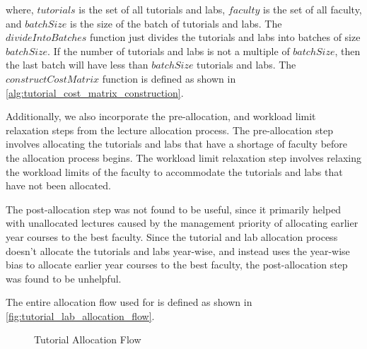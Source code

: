 where, $tutorials$ is the set of all tutorials and labs, $faculty$ is the set of all faculty, and $batchSize$ is the size of the batch of tutorials and labs. The $divideIntoBatches$ function just divides the tutorials and labs into batches of size $batchSize$. If the number of tutorials and labs is not a multiple of $batchSize$, then the last batch will have less than $batchSize$ tutorials and labs. The $constructCostMatrix$ function is defined as shown in \autoref{alg:tutorial_cost_matrix_construction}.

Additionally, we also incorporate the pre-allocation, and workload limit relaxation steps from the lecture allocation process. The pre-allocation step involves allocating the tutorials and labs that have a shortage of faculty before the allocation process begins. The workload limit relaxation step involves relaxing the workload limits of the faculty to accommodate the tutorials and labs that have not been allocated.

The post-allocation step was not found to be useful, since it primarily helped with unallocated lectures caused by the management priority of allocating earlier year courses to the best faculty. Since the tutorial and lab allocation process doesn't allocate the tutorials and labs year-wise, and instead uses the year-wise bias to allocate earlier year courses to the best faculty, the post-allocation step was found to be unhelpful.

The entire allocation flow used for  is defined as shown in \autoref{fig:tutorial_lab_allocation_flow}.

\begin{figure}[H]
  \centering
  \caption{Tutorial Allocation Flow}
  \label{fig:tutorial_lab_allocation_flow}
\end{figure}

